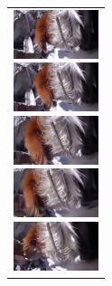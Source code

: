 \begin{enumerate}
\begin{end}
\begin{figure}[H]
\begin{tabular}{l}
\\ %
      \begin{minipage}{0.165\hsize}
        \begin{center}
          \includegraphics[clip, width=2.5cm]{./Figures/still_sniffcling1.eps}
        \end{center}
      \end{minipage}
      \begin{minipage}{0.165\hsize}
        \begin{center}
          \includegraphics[clip, width=2.5cm]{./Figures/still_sniffcling2.eps}
        \end{center}
      \end{minipage}
      \begin{minipage}{0.165\hsize}
        \begin{center}
          \includegraphics[clip, width=2.5cm]{./Figures/still_sniffcling3.eps}
        \end{center}
      \end{minipage}
      \begin{minipage}{0.165\hsize}
        \begin{center}
          \includegraphics[clip, width=2.5cm]{./Figures/still_sniffcling4.eps}
        \end{center}
      \end{minipage}
      \begin{minipage}{0.165\hsize}
        \begin{center}
          \includegraphics[clip, width=2.5cm]{./Figures/still_sniffcling5.eps}

\end{center}
\end{minipage}
\end{tabular}
\end{figure}
\end{end}
\end{enumerate}
